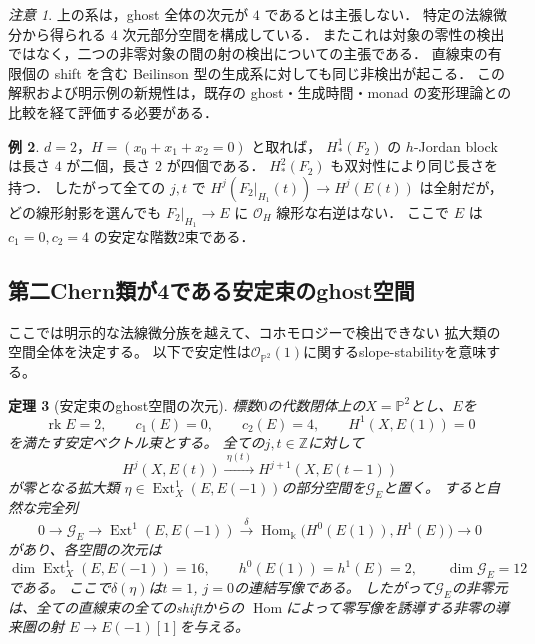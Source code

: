 \documentclass[a4paper,11pt]{ltjsarticle}
\numberwithin{equation}{section}
\theoremstyle{plain}
\newtheorem{theorem}{定理}[section]
\theoremstyle{definition}
\newtheorem{example}[theorem]{例}
\theoremstyle{remark}
\newtheorem{remark}[theorem]{注意}
\begin{document}
\begin{remark}
上の系は，ghost 全体の次元が $4$ であるとは主張しない．
特定の法線微分から得られる $4$ 次元部分空間を構成している．
またこれは対象の零性の検出ではなく，二つの非零対象の間の射の検出についての主張である．
直線束の有限個の shift を含む Beilinson 型の生成系に対しても同じ非検出が起こる．
この解釈および明示例の新規性は，既存の ghost・生成時間・monad の変形理論との
比較を経て評価する必要がある．
\end{remark}

\begin{example}
\label{ex:quadratic-invisible}
$d=2$，$H=(x_0+x_1+x_2=0)$ と取れば，
$H^1_*(F_2)$ の $h$-Jordan block は長さ $4$ が二個，長さ $2$ が四個である．
$H^2_*(F_2)$ も双対性により同じ長さを持つ．
したがって全ての $j,t$ で $H^j(F_2|_{H_1}(t))\to H^j(E(t))$ は全射だが，
どの線形射影を選んでも $F_2|_{H_1}\to E$ に $\mathcal O_H$ 線形な右逆はない．
ここで $E$ は $c_1=0,c_2=4$ の安定な階数2束である．
\end{example}




\subsection{第二Chern類が4である安定束のghost空間}
\label{subsec:ghost-exact-dimension}

ここでは明示的な法線微分族を越えて、コホモロジーで検出できない
拡大類の空間全体を決定する。
以下で安定性は$\mathcal O_{\mathbb P^2}(1)$に関するslope-stabilityを意味する。

\begin{theorem}[安定束のghost空間の次元]
\label{thm:ghost-dimension-twelve}
標数$0$の代数閉体上の$X=\mathbb P^2$とし、$E$を
\[
 \operatorname{rk}E=2,\qquad c_1(E)=0,\qquad c_2(E)=4,
 \qquad H^1(X,E(1))=0
\]
を満たす安定ベクトル束とする。
全ての$j,t\in\mathbb Z$に対して
\[
 H^j(X,E(t))\xrightarrow{\ \eta(t)\ }
 H^{j+1}(X,E(t-1))
\]
が零となる拡大類
$\eta\in\operatorname{Ext}^1_X(E,E(-1))$の部分空間を$\mathcal G_E$と置く。
すると自然な完全列
\begin{equation}
\label{eq:full-ghost-exact-sequence}
 0\longrightarrow\mathcal G_E
 \longrightarrow\operatorname{Ext}^1(E,E(-1))
 \xrightarrow{\ \delta\ }
 \operatorname{Hom}_{\Bbbk}\bigl(H^0(E(1)),H^1(E)\bigr)
 \longrightarrow0
\end{equation}
があり、各空間の次元は
\[
 \dim\operatorname{Ext}^1_X(E,E(-1))=16,\qquad
 h^0(E(1))=h^1(E)=2,\qquad \dim\mathcal G_E=12
\]
である。
ここで$\delta(\eta)$は$t=1$, $j=0$の連結写像である。
したがって$\mathcal G_E$の非零元は、全ての直線束の全てのshiftからの
$\operatorname{Hom}$によって零写像を誘導する非零の導来圏の射
$E\to E(-1)[1]$を与える。
\end{theorem}
\end{document}
